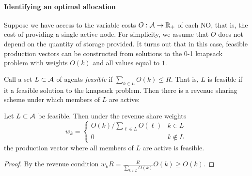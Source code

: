 \paragraph{Identifying an optimal allocation}
%
Suppose we have access to the variable costs $O:\mathcal{A}\rightarrow\mathbb{R}_+$ of each NO, that is, the cost of providing a single active node.
%
For simplicity, we assume that $O$ does not depend on the quantity of storage provided.
%
It turns out that in this case, feasible production vectors can be constructed from solutions to the 0-1 knapsack problem with weights $O(k)$ and all values equal to $1$.

Call a set $L\subset\mathcal{A}$ of agents \emph{feasible} if $\sum_{k\in L}O(k)\leq R$.
%
That is, $L$ is feasible if it a feasible solution to the knapsack problem.
%
Then there is a revenue sharing scheme under which members of $L$ are active:

\begin{lemma}
\label{feasible-production}

  Let $L\subset\mathcal{A}$ be feasible.
  Then under the revenue share weights
  \[
    w_k = \left\{ \begin{array}{ll}
      O(k)/\sum_{\ell\in L}O(\ell) & k\in L \\
      0 & k \not\in L
    \end{array} \right.
  \]
  the production vector where all members of $L$ are active is feasible.

\end{lemma}
%
\begin{proof}

  By the revenue condition $w_kR = \frac{R}{\sum_{k\in L}O(k)}O(k) \geq O(k)$. \qedhere

\end{proof}

